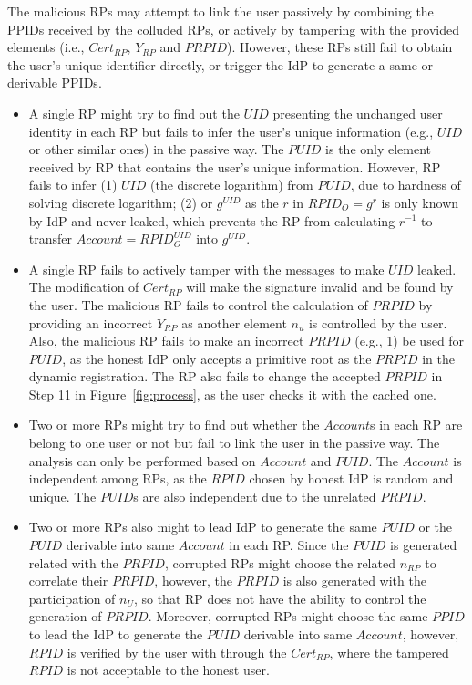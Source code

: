  The malicious RPs may attempt to link the user passively by combining the PPIDs received by the colluded RPs, or actively by tampering with the provided elements (i.e., $Cert_{RP}$, $Y_{RP}$ and $PRPID$). However, these RPs still fail to obtain the user's unique identifier directly, or trigger the IdP to generate a same or derivable PPIDs.
\begin{itemize}
\item A single RP might try to find out the $UID$ presenting the unchanged user identity in each RP but fails to infer the user's unique information (e.g., $UID$ or other similar ones) in the passive way. The $PUID$ is the only element received by RP that contains the user's unique information. However, RP fails to infer (1) $UID$ (the discrete logarithm) from $PUID$, due to hardness of solving discrete logarithm; (2) or $g^{UID}$ as the $r$ in $RPID_O=g^r$ is only known by IdP and never leaked, which prevents the RP from calculating $r^{-1}$ to transfer $Account=RPID_O^{UID}$ into  $g^{UID}$.
\item A single RP fails to actively tamper with the messages to make $UID$ leaked. The modification of  $Cert_{RP}$ will make the signature invalid and be found by the user. The malicious RP fails to control the calculation of $PRPID$ by providing an incorrect $Y_{RP}$ as another element $n_u$ is  controlled by the user. Also, the malicious RP fails to make an incorrect $PRPID$ (e.g., 1)  be used for $PUID$, as the honest IdP only accepts a primitive root as the $PRPID$ in the dynamic registration. The RP also fails to change the accepted $PRPID$ in Step 11 in Figure~\ref{fig:process}, as the user checks it with the cached one.
\item Two or more RPs might try to find out whether the $Account$s in each RP are belong to one user or not but fail to link the user in the passive way. The analysis can only be performed based on $Account$ and $PUID$. The $Account$ is independent among RPs, as the $RPID$ chosen by honest IdP is random and unique. The $PUID$s are  also independent due to the unrelated $PRPID$.
\item Two or more RPs also might to lead IdP to generate the same $PUID$ or the $PUID$ derivable into same $Account$ in each RP. Since the $PUID$ is generated related with the $PRPID$, corrupted RPs might choose the related $n_{RP}$ to correlate their $PRPID$, however, the $PRPID$ is also generated with the participation of $n_{U}$, so that RP does not have the ability to control the generation of $PRPID$. Moreover, corrupted RPs might choose the same $PPID$ to lead the IdP to generate the $PUID$ derivable into same $Account$, however, $RPID$ is verified by the user with through the $Cert_{RP}$, where the tampered $RPID$ is not acceptable to the honest user.

\end{itemize}
